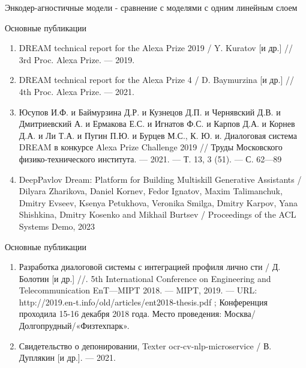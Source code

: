 \begin{frame}{Энкодер-агностичные модели - сравнение с моделями с одним линейным слоем}
\begin{frame}{Основные публикации}
\begin{enumerate}
\item DREAM technical report for the Alexa Prize 2019 / Y. Kuratov
[и др.] // 3rd Proc. Alexa Prize. — 2019.
\item DREAM technical report for the Alexa Prize 4  / D. Baymurzina
[и др.] // 4th Proc. Alexa Prize. — 2021.
\item Юсупов И.Ф. и Баймурзина Д.Р. и Кузнецов Д.П. и Чернявский Д.В. и Дмитриевский А. и Ермакова Е.С. и Игнатов Ф.С. и Карпов Д.А. и Корнев Д.А. и Ли Т.А. и Пугин П.Ю. и Бурцев М.С., К. Ю. и. Диалоговая система DREAM в конкурсе Alexa
Prize Challenge 2019 // Труды Московского физико-технического
института. — 2021. — Т. 13, 3 (51). — С. 62—89
\item DeepPavlov Dream: Platform for Building Multiskill Generative Assistants / Dilyara Zharikova, Daniel Kornev, Fedor Ignatov, Maxim Talimanchuk, Dmitry Evseev, Ksenya Petukhova, Veronika Smilga, Dmitry Karpov, Yana Shishkina, Dmitry Kosenko and Mikhail Burtsev / Proceedings of the ACL Systems Demo, 2023
\end{enumerate}
\end{frame}
\begin{frame}{Основные публикации}
\begin{enumerate}
\item Разработка диалоговой системы с интеграцией профиля лично­
сти  / Д. Болотин [и др.] //. 5th International Conference
on Engineering and Telecommunication EnT—MIPT 2018. — MIPT,
2019. — URL: http://2019.en-t.info/old/articles/ent2018-thesis.pdf ;
Конференция проходила 15-16 декабря 2018 года. Место проведения:
Москва/Долгопрудный/«Физтехпарк».
\item Свидетельство о депонировании, Texter ocr-cv-nlp-microservice / В. Дуплякин [и др.]. — 2021.
\end{enumerate}    
\end{frame}



\end{frame}
